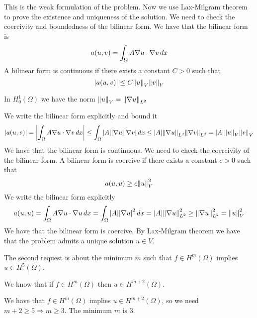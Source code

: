 This is the weak formulation of the problem. Now we use Lax-Milgram theorem to prove the existence and uniqueness of the solution. We need to check the coercivity and boundedness of the bilinear form. We have that the bilinear form is 
\[
    a(u, v) = \int_\Omega A \nabla u \cdot \nabla v \, dx
\]
A bilinear form is continuous if there exists a constant \(C > 0\) such that
\[
    \abs{a(u, v)} \leq C \norm{u}_V \norm{v}_V
\]
\begin{remark}
    In \(H^1_0(\Omega)\) we have the norm \(\norm{u}_V = \norm{\nabla u}_{L^2}\)
\end{remark}
We write the bilinear form explicitly and bound it
\[
    \begin{split}
        \abs{a(u, v)} = \abs{\int_\Omega A \nabla u \cdot \nabla v \, dx} \leq \int_\Omega \abs{A} \abs{\nabla u} \abs{\nabla v} \, dx \leq \abs{A} \norm{\nabla u}_{L^2} \norm{\nabla v}_{L^2} = \abs{A} \norm{u}_V \norm{v}_V
    \end{split}
\]
We have that the bilinear form is continuous. We need to check the coercivity of the bilinear form. A bilinear form is coercive if there exists a constant \(c > 0\) such that
\[
    a(u, u) \geq c \norm{u}_V^2
\]
We write the bilinear form explicitly 
\[
    \begin{split}
        a(u, u) = \int_\Omega A \nabla u \cdot \nabla u \, dx = \int_\Omega \abs{A} \abs{\nabla u}^2 \, dx = \abs{A} \norm{\nabla u}_{L^2}^2 \geq \norm{\nabla u}_{L^2}^2 = \norm{u}_V^2
    \end{split}
\]
We have that the bilinear form is coercive. By Lax-Milgram theorem we have that the problem admits a unique solution \(u \in V\).

The second request is about the minimum \(m\) such that \(f \in H^m(\Omega)\) implies \(u \in H^5(\Omega)\). 
\begin{remark}
    We know that if \(f \in H^m(\Omega)\) then \(u \in H^{m+2}(\Omega)\).
\end{remark}
We have that \(f \in H^m(\Omega)\) implies \(u \in H^{m+2}(\Omega)\), so we need \(m+2 \geq 5 \Rightarrow m \geq 3\). The minimum \(m\) is 3.

\newpage
